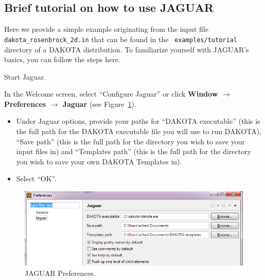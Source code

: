 \newpage
\subsection{Brief tutorial on how to use JAGUAR}

Here we provide a simple example originating from the input file {\tt
  dakota\_rosenbrock\_2d.in} that can be found in the {\tt
  examples/tutorial} directory of a DAKOTA distribution. To
familiarize yourself with JAGUAR's basics, you can follow the steps
here.

Start Jaguar.

In the Welcome screen, select ``Configure Jaguar'' or click {\bf
  Window $\rightarrow$ Preferences $\rightarrow$ Jaguar} (see
Figure~\ref{fig:input:0Preferences}).
\begin{itemize}
\item Under Jaguar options, provide your paths for ``DAKOTA
  executable'' (this is the full path for the DAKOTA executable file
  you will use to run DAKOTA), ``Save path'' (this is the full path
  for the directory you wish to save your input files in) and
  ``Templates path'' (this is the full path for the directory you wish
  to save your own DAKOTA Templates in).
\item Select ``OK''.
\end{itemize}
\begin{figure}[htbp]
  \centering
  \includegraphics[scale=0.6]{images/0Preferences}
  \caption{JAGUAR Preferences.}
  \label{fig:input:0Preferences}
\end{figure}

